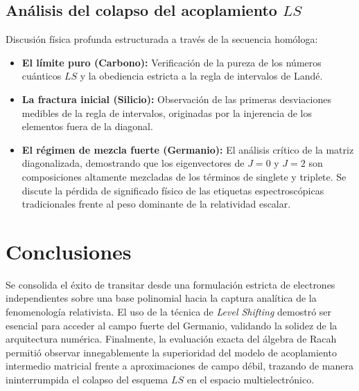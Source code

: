 \documentclass[12pt,a4paper]{book}
\begin{document}
\subsection{Análisis del colapso del acoplamiento $LS$}
Discusión física profunda estructurada a través de la secuencia homóloga:
\begin{itemize}
    \item \textbf{El límite puro (Carbono):} Verificación de la pureza de los números cuánticos $LS$ y la obediencia estricta a la regla de intervalos de Landé.
    \item \textbf{La fractura inicial (Silicio):} Observación de las primeras desviaciones medibles de la regla de intervalos, originadas por la injerencia de los elementos fuera de la diagonal.
    \item \textbf{El régimen de mezcla fuerte (Germanio):} El análisis crítico de la matriz diagonalizada, demostrando que los eigenvectores de $J=0$ y $J=2$ son composiciones altamente mezcladas de los términos de singlete y triplete. Se discute la pérdida de significado físico de las etiquetas espectroscópicas tradicionales frente al peso dominante de la relatividad escalar.
\end{itemize}

\section{Conclusiones}
Se consolida el éxito de transitar desde una formulación estricta de electrones independientes sobre una base polinomial hacia la captura analítica de la fenomenología relativista. El uso de la técnica de \textit{Level Shifting} demostró ser esencial para acceder al campo fuerte del Germanio, validando la solidez de la arquitectura numérica. Finalmente, la evaluación exacta del álgebra de Racah permitió observar innegablemente la superioridad del modelo de acoplamiento intermedio matricial frente a aproximaciones de campo débil, trazando de manera ininterrumpida el colapso del esquema $LS$ en el espacio multielectrónico.
\end{document}
